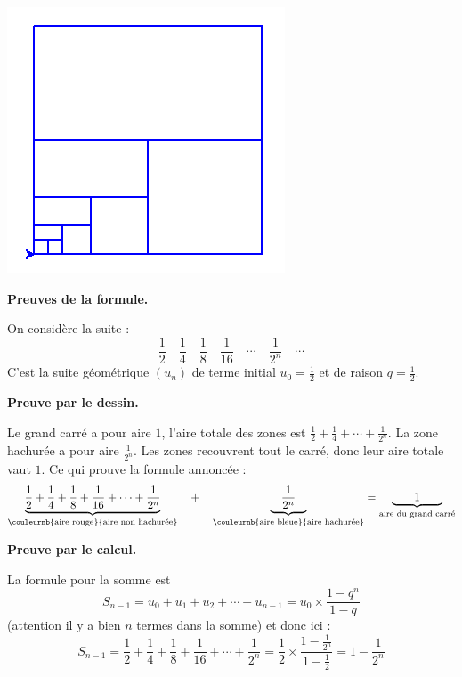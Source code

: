 \documentclass[11pt,class=report,crop=false]{standalone}
\begin{document}
\begin{activite}
\begin{center}
\includegraphics[scale=\myscale,scale=0.3]{ecran-carre-8}
\end{center}


\bigskip

\textbf{Preuves de la formule.}

On considère la suite : 
$$\frac12 \quad \frac14 \quad \frac18 \quad \frac1{16} \quad \cdots \quad \frac{1}{2^n} \quad \cdots$$
C'est la suite géométrique $(u_n)$ de terme initial $u_0 = \frac12$ et de raison $q=\frac12$.


\textbf{Preuve par le dessin.}

Le grand carré a pour aire $1$, l'aire totale des zones
 est $\frac12 + \frac14  + \cdots + \frac{1}{2^n}$.
La zone hachurée a pour aire $\frac{1}{2^n}$. 
Les zones recouvrent tout le carré, donc leur aire totale vaut $1$. Ce qui prouve la formule annoncée :
$$\underbrace{\frac12 + \frac14 + \frac18 + \frac1{16} + \cdots + \frac{1}{2^n}}_{\text{\couleurnb{aire rouge}{aire non hachurée}}} \quad + \quad \underbrace{\quad \frac{1}{2^n} \quad}_{\text{\couleurnb{aire bleue}{aire hachurée}}}
= \underbrace{\qquad 1 \qquad}_{\text{aire du grand carré}}$$

\bigskip

\textbf{Preuve par le calcul.}

La formule pour la somme est 
$$S_{n-1} = u_0 + u_1 + u_2 + \cdots + u_{n-1} = u_0 \times \dfrac{1-q^{n}}{1-q}$$
(attention il y a bien $n$ termes dans la somme) et donc ici :
$$S_{n-1} =\frac12 + \frac14 + \frac18 + \frac1{16} + \cdots + \frac{1}{2^n}
= \frac12 \times \frac{1 - \frac{1}{2^n}}{1-\frac12}
= 1 - \frac{1}{2^{n}}$$

\end{activite}
\end{document}
